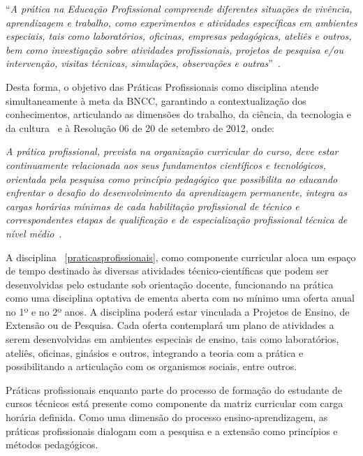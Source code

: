 \documentclass[11pt,fleqn]{book} %
\renewenvironment{quote}
{\small\list{}{\rightmargin=.1cm \leftmargin=2.5cm}%
	\item\relax}
{\endlist}
\begin{document}
\begin{quote}
``\textit{A prática na Educação Profissional compreende diferentes situações de vivência, aprendizagem e trabalho, como experimentos e atividades específicas em ambientes especiais, tais como laboratórios, oficinas, empresas pedagógicas, ateliês e outros, bem como investigação sobre atividades profissionais, projetos de pesquisa e/ou intervenção, visitas técnicas, simulações, observações e outras}''~\cite{Resolucao06De2012}.
\end{quote}

Desta forma, o objetivo das Práticas Profissionais como disciplina atende simultaneamente à meta da BNCC, garantindo a contextualização dos conhecimentos, articulando as dimensões do trabalho, da ciência, da tecnologia e da cultura~\cite{BNCC2019} e à Resolução 06 de 20 de setembro de 2012, onde:
\begin{quote}
	\textit{A prática profissional, prevista na organização curricular do curso, deve estar continuamente relacionada aos seus fundamentos científicos e tecnológicos, orientada pela pesquisa como princípio pedagógico que possibilita ao educando enfrentar o desafio do desenvolvimento da aprendizagem permanente, integra as cargas horárias mínimas de cada habilitação profissional de técnico e correspondentes etapas de qualificação e de especialização profissional técnica de nível médio}~\cite{Resolucao06De2012}.
\end{quote}

A disciplina ~\ref{praticasprofissionais}, como componente curricular aloca um espaço de tempo destinado às diversas atividades técnico-científicas que podem ser desenvolvidas pelo estudante sob orientação docente, funcionando na prática como uma disciplina optativa de ementa aberta com no mínimo uma oferta anual no 1º e no 2º anos.
A disciplina poderá estar vinculada a Projetos de Ensino, de Extensão ou de Pesquisa.
Cada oferta contemplará um plano de atividades a serem desenvolvidas em ambientes especiais de ensino, tais como laboratórios, ateliês, oficinas, ginásios e outros, integrando a teoria com a prática e possibilitando a articulação com os organismos sociais, entre outros.

Práticas profissionais enquanto parte do processo de formação do estudante de cursos técnicos está presente como componente da matriz curricular com carga horária definida.
Como uma dimensão do processo ensino-aprendizagem, as práticas profissionais dialogam com a pesquisa e a extensão como princípios e métodos pedagógicos. 
\end{document}
